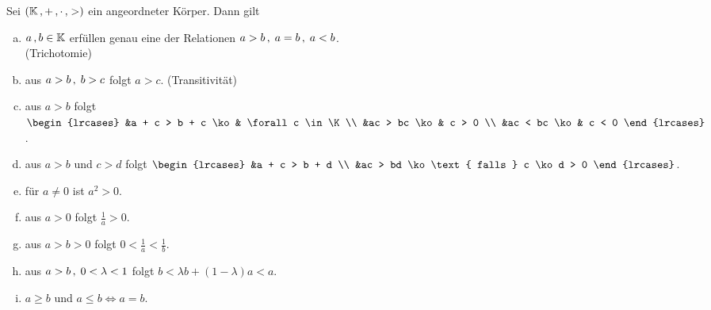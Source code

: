 \documentclass[../ana1.tex]{subfiles}
\begin{document}
\begin{satz}\label{satz:arechenregeln}
	Sei \((\mathbb{K} \operatorname{,} + \operatorname{,} \cdot \operatorname{,} >) \) ein angeordneter Körper. Dann gilt
	\begin{enumerate}[(a)]
		\item \(a \operatorname{,} b \in \mathbb{K} \) erfüllen genau eine der Relationen \(a > b \operatorname{,}  \; a = b \operatorname{,}  \; a < b \). \\
			  (Trichotomie)
		\item aus \(a > b \operatorname{,}  \; b > c \) folgt \(a > c \). (Transitivität)
		\item aus \(a > b \) folgt
		      \(\begin{lrcases}
					&a + c > b + c \ko & \forall c \in \K \\
				    &ac > bc \ko 	   & c > 0 \\
				    &ac < bc \ko 	   & c < 0
			    \end{lrcases} \).
		\item aus \(a > b \) und \(c>d \) folgt
		      \(\begin{lrcases}
				      &a + c > b + d  \\
					  &ac > bd \ko \text{ falls } c \ko d > 0
			      \end{lrcases} \).
		\item für \(a\neq 0 \) ist \(a^{2} > 0 \).
		\item aus \(a > 0 \) folgt \(\frac{1}{a} > 0 \).
		\item aus \(a > b > 0 \) folgt \(0 < \frac{1}{a} < \frac{1}{b} \).
		\item aus \(a > b \operatorname{,}  \; 0 < \lambda < 1 \) folgt \(b < \lambda b + (1 - \lambda)a < a \).
		\item \(a \geq b \) und \(a \leq b \iff a = b \).
	\end{enumerate}
\end{satz}
\end{document}

